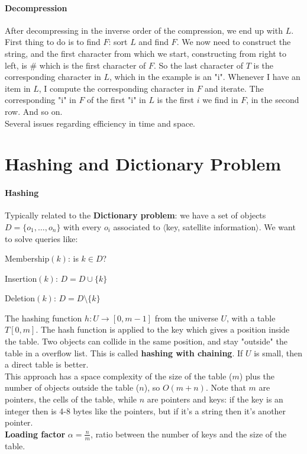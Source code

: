\documentclass[10pt]{report}
\begin{document}
\paragraph{Decompression} After decompressing in the inverse order of the compression, we end up with $L$.\\
First thing to do is to find $F$: sort $L$ and find $F$. We now need to construct the string, and the first character from which we start, constructing from right to left, is \# which is the first character of $F$. So the last character of $T$ is the corresponding character in $L$, which in the example is an "i". Whenever I have an item in $L$, I compute the corresponding character in $F$ and iterate. The corresponding "i" in $F$ of the first "i" in $L$ is the first $i$ we find in $F$, in the second row. And so on.\\
Several issues regarding efficiency in time and space.
\section{Hashing and Dictionary Problem} 
\paragraph{Hashing} Typically related to the \textbf{Dictionary problem}: we have a set of objects $D=\{o_1,\ldots,o_n\}$ with every $o_i$ associated to $\langle$key, satellite information$\rangle$. We want to solve queries like:
\begin{list}{}{}
	\item Membership$(k)$: is $k\in D$?
	\item Insertion$(k)$: $D = D \cup \{k\}$
	\item Deletion$(k)$: $D = D \setminus \{k\}$
\end{list}
The hashing function $h : U\rightarrow [0, m-1]$ from the universe $U$, with a table $T[0,m]$. The hash function is applied to the key which gives a position inside the table. Two objects can collide in the same position, and stay "outside" the table in a overflow list. This is called \textbf{hashing with chaining}. If $U$ is small, then a direct table is better.\\
This approach has a space complexity of the size of the table ($m$) plus the number of objects outside the table ($n$), so $O(m+n)$. Note that $m$ are pointers, the cells of the table, while $n$ are pointers and keys: if the key is an integer then is 4-8 bytes like the pointers, but if it's a string then it's another pointer.\\
\textbf{Loading factor} $\alpha = \frac{n}{m}$, ratio between the number of keys and the size of the table.
\end{document}
